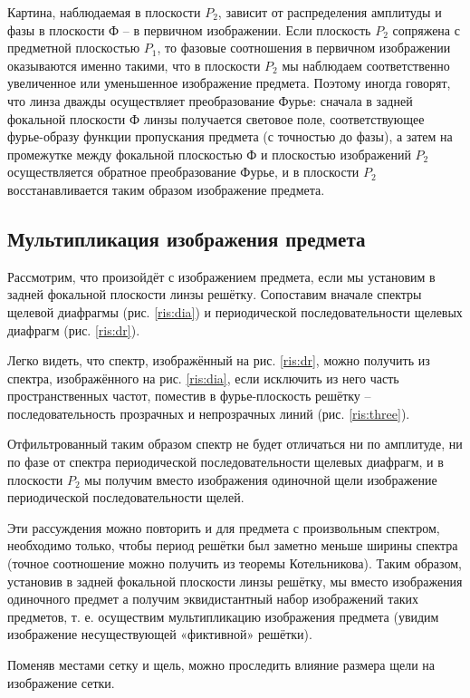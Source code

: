 \documentclass[a5paper,10pt, twoside]{article} %
\begin{document}
	Картина, наблюдаемая в плоскости $P_2$, зависит от распределения амплитуды и фазы в плоскости
	Ф -- в первичном изображении. Если плоскость $P_2$ сопряжена с предметной плоскостью
	$P_1$, то фазовые соотношения в первичном изображении оказываются именно такими, что в 
	плоскости $P_2$ мы наблюдаем соответственно увеличенное или уменьшенное изображение предмета. 
	Поэтому иногда говорят, что линза дважды осуществляет преобразование Фурье: сначала в задней 
	фокальной плоскости Ф линзы получается световое
	поле, соответствующее фурье-образу функции пропускания предмета (с точностью до фазы),	а 
	затем на промежутке между фокальной плоскостью Ф и плоскостью изображений $P_2$ 
	осуществляется обратное преобразование Фурье, и в плоскости $P_2$ восстанавливается таким 
	образом	изображение предмета.
	
	
\subsection{Мультипликация изображения предмета}

	Рассмотрим, что произойдёт с изображением предмета, если мы	установим в задней фокальной 
	плоскости линзы решётку. Сопоставим вначале спектры щелевой диафрагмы (рис. \ref{ris:dia}) и 
	периодической последовательности щелевых диафрагм (рис. \ref{ris:dr}).
	
	Легко видеть, что спектр, изображённый на рис. \ref{ris:dr}, можно получить из спектра, 
	изображённого на рис. \ref{ris:dia}, если исключить из него часть пространственных частот, 
	поместив в фурье-плоскость решётку -- последовательность прозрачных и непрозрачных линий 
	(рис. \ref{ris:three}).
	
	Отфильтрованный таким образом спектр не будет отличаться ни по амплитуде, ни по фазе от 
	спектра периодической последовательности щелевых диафрагм, и в плоскости $P_2$ мы получим 
	вместо изображения одиночной щели изображение периодической последовательности щелей.
	
	Эти рассуждения можно повторить и для предмета с произвольным спектром, необходимо только, 
	чтобы период решётки был заметно меньше ширины спектра (точное соотношение можно получить из 
	теоремы Котельникова). Таким образом, установив в задней фокальной плоскости линзы решётку, 
	мы вместо изображения одиночного предмет а получим эквидистантный набор изображений таких 
	предметов, т. е. осуществим мультипликацию изображения предмета (увидим изображение	
	несуществующей «фиктивной» решётки).
	
	Поменяв местами сетку и щель, можно проследить влияние размера щели на изображение сетки.
	
\end{document}
